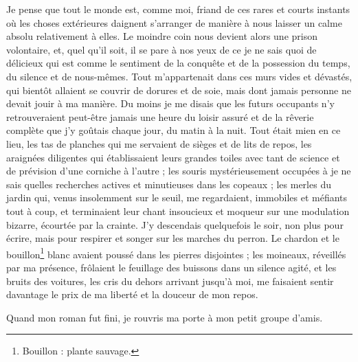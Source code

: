 {Je pense que tout le monde est, comme moi, friand de ces rares et courts instants où les choses extérieures daignent s’arranger de manière à nous laisser un calme absolu relativement à elles. Le moindre coin nous devient alors une prison volontaire, et, quel qu’il soit, il se pare à nos yeux de ce je ne sais quoi de délicieux qui est comme le sentiment de la conquête et de la possession du temps, du silence et de nous-mêmes. Tout m’appartenait dans ces murs vides et dévastés, qui bientôt allaient se couvrir de dorures et de soie, mais dont jamais personne ne devait jouir à ma manière. Du moins je me disais que les futurs occupants n’y retrouveraient peut-être jamais une heure du loisir assuré et de la rêverie complète que j’y goûtais chaque jour, du matin à la nuit. Tout était mien en ce lieu, les tas de planches qui me servaient de sièges et de lits de repos, les araignées diligentes qui établissaient leurs grandes toiles avec tant de science et de prévision d’une corniche à l’autre ; les souris mystérieusement occupées à je ne sais quelles recherches actives et minutieuses dans les copeaux ; les merles du jardin qui, venus insolemment sur le seuil, me regardaient, immobiles et méfiants tout à coup, et terminaient leur chant insoucieux et moqueur sur une modulation bizarre, écourtée par la crainte. J’y descendais quelquefois le soir, non plus pour écrire, mais pour respirer et songer sur les marches du perron. Le chardon et le bouillon\footnote{Bouillon : plante sauvage.} blanc avaient poussé dans les pierres disjointes ; les moineaux, réveillés par ma présence, frôlaient le feuillage des buissons dans un silence agité, et les bruits des voitures, les cris du dehors arrivant jusqu’à moi, me faisaient sentir davantage le prix de ma liberté et la douceur de mon repos.

Quand mon roman fut fini, je rouvris ma porte à mon petit groupe d’amis.

}


